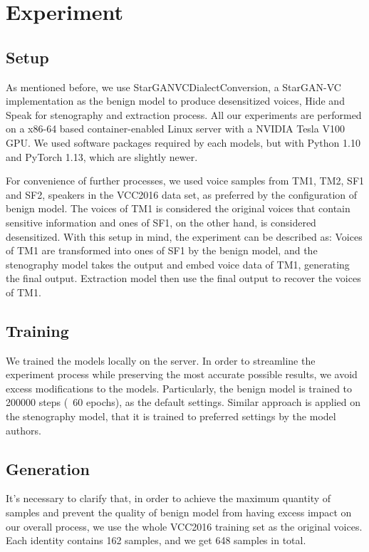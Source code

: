 \documentclass[journal]{IEEEtran} %
\begin{document}
\section{Experiment}

\subsection{Setup}

As mentioned before, we use StarGANVCDialectConversion, a StarGAN-VC implementation as the benign model to produce desensitized voices, Hide and Speak for stenography and extraction process. All our experiments are performed on a x86-64 based container-enabled Linux server with a NVIDIA Tesla V100 GPU. We used software packages required by each models, but with Python 1.10 and PyTorch 1.13, which are slightly newer.

 For convenience of further processes, we used voice samples from TM1, TM2, SF1 and SF2, speakers in the VCC2016 data set, as preferred by the configuration of benign model. The voices of TM1 is considered the original voices that contain sensitive information and ones of SF1, on the other hand, is considered desensitized. With this setup in mind, the experiment can be described as: Voices of TM1 are transformed into ones of SF1 by the benign model, and the stenography model takes the output and embed voice data of TM1, generating the final output. Extraction model then use the final output to recover the voices of TM1.

\subsection{Training}

We trained the models locally on the server. In order to streamline the experiment process while preserving the most accurate possible results, we avoid excess modifications to the models. Particularly, the benign model is trained to 200000 steps (~60 epochs), as the default settings. Similar approach is applied on the stenography model, that it is trained to preferred settings by the model authors.

\subsection{Generation}

It's necessary to clarify that, in order to achieve the maximum quantity of samples and prevent the quality of benign model from having excess impact on our overall process, we use the whole VCC2016 training set as the original voices. Each identity contains 162 samples, and we get 648 samples in total.
\end{document}
